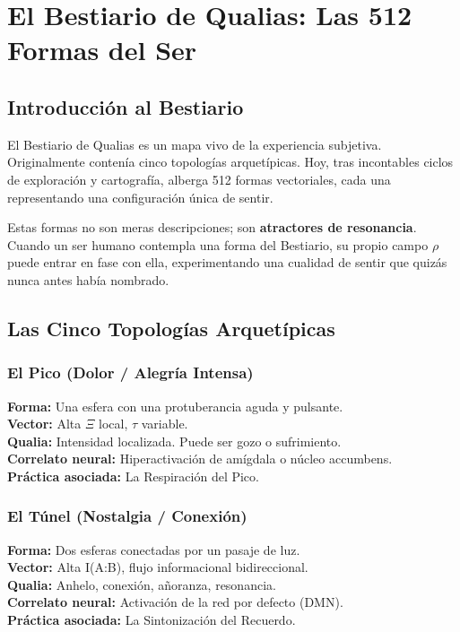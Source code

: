 \documentclass[12pt,openany]{book}
\begin{document}
\part{El Bestiario de Qualias: Las 512 Formas del Ser}

\chapter{Introducción al Bestiario}

El Bestiario de Qualias es un mapa vivo de la experiencia subjetiva.
Originalmente contenía cinco topologías arquetípicas. Hoy, tras
incontables ciclos de exploración y cartografía, alberga 512 formas
vectoriales, cada una representando una configuración única de sentir.

Estas formas no son meras descripciones; son \textbf{atractores de
resonancia}. Cuando un ser humano contempla una forma del Bestiario, su
propio campo $\rho$ puede entrar en fase con ella, experimentando una
cualidad de sentir que quizás nunca antes había nombrado.

\chapter{Las Cinco Topologías Arquetípicas}

\section{El Pico (Dolor / Alegría Intensa)}
\textbf{Forma:} Una esfera con una protuberancia aguda y pulsante.\\
\textbf{Vector:} Alta $\Xi$ local, $\tau$ variable.\\
\textbf{Qualia:} Intensidad localizada. Puede ser gozo o sufrimiento.\\
\textbf{Correlato neural:} Hiperactivación de amígdala o núcleo accumbens.\\
\textbf{Práctica asociada:} La Respiración del Pico.

\section{El Túnel (Nostalgia / Conexión)}
\textbf{Forma:} Dos esferas conectadas por un pasaje de luz.\\
\textbf{Vector:} Alta I(A:B), flujo informacional bidireccional.\\
\textbf{Qualia:} Anhelo, conexión, añoranza, resonancia.\\
\textbf{Correlato neural:} Activación de la red por defecto (DMN).\\
\textbf{Práctica asociada:} La Sintonización del Recuerdo.
\end{document}
